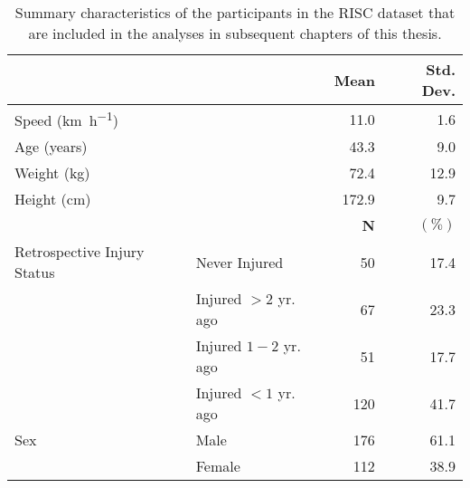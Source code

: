 \begin{table}
\centering
\begin{tabular}[t]{llrr}
\toprule
  &    & \textbf{Mean} & \textbf{Std. Dev.}\\
\midrule
Speed (\si{\km \per \hour}) &  & 11.0 & 1.6\\
Age (years) &  & 43.3 & 9.0\\
Weight (kg) &  & 72.4 & 12.9\\
Height (cm) &  & 172.9 & 9.7\\
\midrule
 &  & \textbf{N} & $\mathbf{\mathbf{(\%)}}$\\
\midrule
Retrospective Injury Status & Never Injured & 50 & 17.4\\
 & Injured $>2$ yr. ago & 67 & 23.3\\
 & Injured $1-2$ yr. ago & 51 & 17.7\\
 & Injured $<1$ yr. ago & 120 & 41.7\\
Sex & Male & 176 & 61.1\\
 & Female & 112 & 38.9\\
\bottomrule
\end{tabular}
\caption{Summary characteristics of the participants in the RISC dataset that are included in the analyses in subsequent chapters of this thesis.}
\label{tab:tab1chpt3.}
\end{table}
